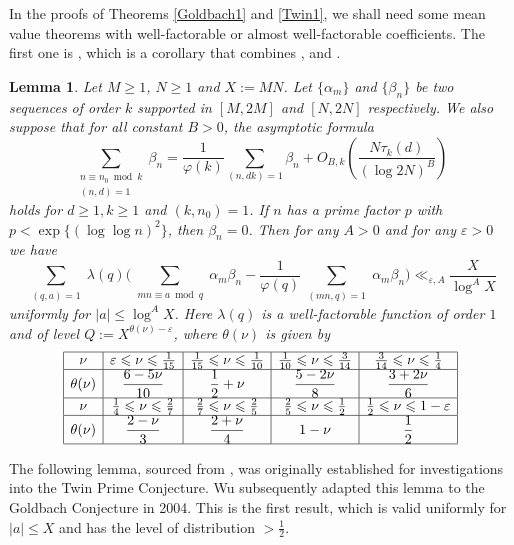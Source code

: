 \documentclass[12pt, a4paper]{amsart}
\def\geq{\geqslant}
\def\le{\leqslant}
\theoremstyle{plain}
\newtheorem{lemma}[proposition]{Lemma}
\theoremstyle{remark}
\numberwithin{equation}{section}
\begin{document}
In the proofs of Theorems \ref{Goldbach1} and \ref{Twin1}, 
we shall need some mean value theorems with well-factorable or 
almost well-factorable coefficients. The first one is \cite[Lemma 2.5]{Wu04}, which is a corollary 
that combines \cite[Corollary 2]{F87}, \cite[Lemma 6]{FG86} 
and \cite[Proposition]{Iwa93}.
		
\begin{lemma}\label{Wu-level}
Let  $M \geq 1$, $N \geq 1$ and $X := MN$. Let $\{ \alpha_m \}$ and $\{ \beta_n \}$ be 
two sequences of order $k$ supported in $[M, 2M]$ and $[N, 2N]$ respectively. We also 
suppose that for all constant $B>0$, the asymptotic formula 
\begin{equation}
\sum_{\substack{n \equiv n_0 \bmod{k} \\ (n, d) = 1}} 
\beta_n = \frac{1}{\varphi(k)} \sum_{(n, dk) = 1} \beta_n + O_{B,k} \! \left( \frac{N \tau_k(d)}{(\log 2N)^B} \right)
\end{equation}
holds for $d \geq 1 , k \geq 1$ and $(k, n_0) = 1$. If $n$ has a prime factor $p$ 
with $p < \exp\{ (\log \log n)^2 \}$, then $\beta_n = 0$. 
Then for any $A>0$ and for any $\varepsilon>0$ we have
$$
\sum_{\substack{(q,a)=1}}\lambda(q)
\bigg(\sum_{\substack{mn\equiv a\bmod{q}}}\alpha_m\beta_n-\frac{1}{\varphi(q)}\sum_{\substack{(mn,q)=1}}\alpha_m\beta_n\bigg)
\ll_{\varepsilon,A}\frac{X}{\log^A X}
		$$
		uniformly for $|a|\le \log^{A} X$. Here $\lambda(q)$ is a well-factorable function of order $1$ and of level 
$Q:=X^{\theta(\nu)-\varepsilon}$,  where $\theta(\nu)$ is given by 
\renewcommand{\arraystretch}{2.4}
\medskip 
\[
\begin{array}{|c|c|c|c|c|}
\hline
\nu & \varepsilon \le \nu \le \frac{1}{15} & \frac{1}{15} \le \nu \le \frac{1}{10} & \frac{1}{10} \le \nu \le \frac{3}{14} & \frac{3}{14} \le \nu \le \frac{1}{4} \\
\hline
\theta(\nu) & \dfrac{6-5\nu}{10} & \dfrac{1}{2}+\nu & \dfrac{5-2\nu}{8} & \dfrac{3+2\nu}{6} \\
\hline
\nu & \frac{1}{4} \le \nu \le \frac{2}{7} & \frac{2}{7} \le \nu \le \frac{2}{5} & \frac{2}{5} \le \nu \le \frac{1}{2} & \frac{1}{2} \le \nu \le 1-\varepsilon \\
\hline
\theta(\nu) & \dfrac{2-\nu}{3} & \dfrac{2+\nu}{4} & 1-\nu & \dfrac{1}{2} \\
\hline
\end{array}
\] 
\end{lemma}

\medskip 
		
The following lemma, sourced from \cite[Corollary 2 (i)]{F87}, was originally established for 
investigations into the Twin Prime Conjecture. Wu \cite{Wu04} subsequently adapted this lemma to the 
Goldbach Conjecture in 2004. This is the first result, which is valid uniformly for 
$|a|\le X$ and has the level of distribution $>\frac{1}{2}$.
		
\end{document}
